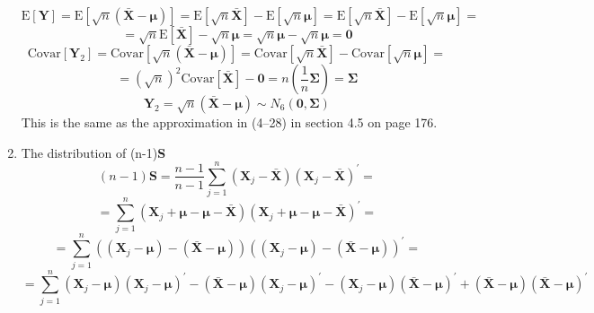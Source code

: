 \begin{enumerate}[label= (\alph*)]
    \[
        \text{E}
        \left[
            \textbf{Y}
        \right]
        =
        \text{E}
        \left[
            \sqrt{n}(\bar{\textbf{X}} - \bm{\mu})
        \right]
        =
        \text{E}\left[\sqrt{n}\bar{\textbf{X}}\right]
        -
        \text{E}\left[\sqrt{n}\bm{\mu}\right]
        =
        \text{E}\left[\sqrt{n}\bar{\textbf{X}}\right]
        -
        \text{E}\left[\sqrt{n}\bm{\mu}\right]
        =
    \]
    \[
        =
        \sqrt{n}\text{E}\left[\bar{\textbf{X}}\right]
        -
        \sqrt{n}\bm{\mu}
        =
        \sqrt{n}\bm{\mu}
        -
        \sqrt{n}\bm{\mu}
        =
        \textbf{0}
    \]
    \[
        \text{Covar}
        \left[
            \textbf{Y}_{2}
        \right]
        =
        \text{Covar}
        \left[
            \sqrt{n}(\bar{\textbf{X}} - \bm{\mu})
        \right]
        =
        \text{Covar}\left[\sqrt{n}\bar{\textbf{X}}\right] - \text{Covar}\left[\sqrt{n}\bm{\mu}\right]
        =
    \]
    \[
        =
        {\left(\sqrt{n}\right)}^{2}\text{Covar}\left[\bar{\textbf{X}}\right] - \textbf{0}
        =
        n\left(\frac{1}{n}\bm{\Sigma}\right)
        =
        \bm{\Sigma}
    \]
    \[
        \textbf{Y}_{2}
        =
        \sqrt{n}(\bar{\textbf{X}} - \bm{\mu})
        \sim
        N_{6}\left(\textbf{0},\bm{\Sigma}\right)
    \]
    This is the same as the approximation in (4--28) in section 4.5 on page 176.
    \item The distribution of (n-1)\textbf{S}
    \[
        (n-1)\textbf{S}
        =
        \frac{n-1}{n -1}
        \sum_{j=1}^{n}{
            \left(\textbf{X}_{j} - \bar{\textbf{X}}\right)
            {\left(\textbf{X}_{j} - \bar{\textbf{X}}\right)}^{\prime}
        }
        =
    \]
    \[
        =
        \sum_{j=1}^{n}{
            \left(\textbf{X}_{j} + \bm{\mu} - \bm{\mu} - \bar{\textbf{X}}\right)
            {\left(\textbf{X}_{j} + \bm{\mu} - \bm{\mu} - \bar{\textbf{X}}\right)}^{\prime}
        }
        =
    \]
    \[
        =
        \sum_{j=1}^{n}{
            \left((\textbf{X}_{j} - \bm{\mu}) - (\bar{\textbf{X}} - \bm{\mu})\right)
            {\left((\textbf{X}_{j} - \bm{\mu}) - (\bar{\textbf{X}} - \bm{\mu})\right)}^{\prime}
        }
        =
    \]
    \[
        =
        \scriptstyle{
        \sum_{j=1}^{n}{
            (\textbf{X}_{j} - \bm{\mu}){(\textbf{X}_{j} - \bm{\mu})}^{\prime}
            -
            (\bar{\textbf{X}} - \bm{\mu}){(\textbf{X}_{j} - \bm{\mu})}^{\prime}
            -
            (\textbf{X}_{j} - \bm{\mu}){(\bar{\textbf{X}} - \bm{\mu})}^{\prime}
            +
            (\bar{\textbf{X}} - \bm{\mu}){(\bar{\textbf{X}} - \bm{\mu})}^{\prime}
}}\]
\end{enumerate}
